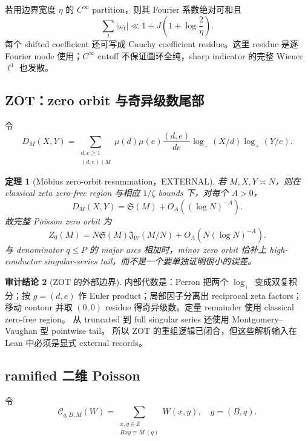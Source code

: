 \documentclass[11pt,a4paper]{ctexart}
\newtheorem{theorem}{定理}[section]
\theoremstyle{definition}
\newtheorem{audit}[theorem]{审计结论}
\newcommand{\1}{\mathbf 1}
\newcommand{\EXTERNAL}{\textcolor{blue!65!black}{\textsf{EXTERNAL}}}
\begin{document}
若用边界宽度 $\eta$ 的 $C^\infty$ partition，则其 Fourier 系数绝对可和且
\[
 \sum_t|\omega_t|\ll 1+J\left(1+\log\frac2\eta\right).\tag{WP.3}
\]
每个 shifted coefficient 还可写成 Cauchy coefficient residue。这里 residue
是逐 Fourier mode 使用；$C^\infty$ cutoff 不保证圆环全纯，sharp indicator
的完整 Wiener $\ell^1$ 也发散。

\subsection{ZOT：zero orbit 与奇异级数尾部}

令
\[
 D_M(X,Y)=\sum_{\substack{d,e\ge1\\(d,e)\mid M}}
 \mu(d)\mu(e)\frac{(d,e)}{de}
 \log_+(X/d)\log_+(Y/e).                             \tag{ZOT.1}
\]

\begin{theorem}[M\"obius zero-orbit resummation，\EXTERNAL]
若 $M,X,Y\asymp N$，则在 classical zeta zero-free region 与相应
$1/\zeta$ bounds 下，对每个 $A>0$，
\[
 D_M(X,Y)=\mathfrak S(M)+O_A((\log N)^{-A}).          \tag{ZOT.2}
\]
故完整 Poisson zero orbit 为
\[
 Z_0(M)=N\mathfrak S(M)\mathfrak J_W(M/N)
 +O_A(N(\log N)^{-A}).                               \tag{ZOT.3}
\]
与 denominator $q\le P$ 的 major arcs 相加时，minor zero orbit 恰补上
high-conductor singular-series tail，而不是一个要单独证明很小的误差。
\end{theorem}

\begin{audit}[ZOT 的外部边界]
内部代数是：Perron 把两个 $\log_+$ 变成双复积分；按
$g=(d,e)$ 作 Euler product；局部因子分离出 reciprocal zeta factors；移动 contour
并取 $(0,0)$ residue 得奇异级数。定量 remainder 使用 classical zero-free region。
从 truncated 到 full singular series 还使用 Montgomery--Vaughan 型 pointwise tail。
所以 ZOT 的重组逻辑已闭合，但这些解析输入在 Lean 中必须是显式 external records。
\end{audit}

\subsection{ramified 二维 Poisson}

令
\[
 \mathcal C_{q,B,M}(W)=\sum_{\substack{x,y\in\mathbb Z\\Bxy\equiv M\ (q)}}W(x,y),
 \quad g=(B,q).
\]
\end{document}
